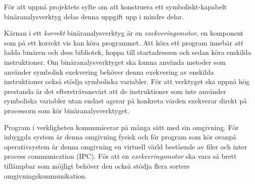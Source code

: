 

För att uppnå projektets syfte om att konstruera ett symboliskt-kapabelt
binäranalysverktyg delas denna uppgift upp i mindre delar.

Kärnan i ett \textit{korrekt} binäranalysverktyg är en
\textit{exekveringsmotor}, en komponent som på ett korrekt vis kan köra
programmet. Att köra ett program innebär att ladda binären och dess bibliotek,
hoppa till startadressen och sedan köra enskilda instruktioner. Om
binäranalysverktyget ska kunna använda metoder som använder symbolisk exekvering
behöver denna exekvering av enskilda instruktioner också stödja symboliska
variabler. För att verktyget ska uppnå hög prestanda är det eftersträvansvärt
att de instruktioner som inte använder symboliska variabler utan endast agerar
på konkreta värden exekverar direkt på processorn som kör binäranalysverktyget.

Program i verkligheten kommunicerar på många sätt med sin omgivning. För
inbyggda system är denna omgivning fysisk och för program som kör ovanpå
operativsystem är denna omgivning en virtuell värld bestående av filer och inter
process communication (IPC). För att en \textit{exekveringsmotor} ska vara så
brett tillämpbar som möjligt behöver den också stödja flera sorters
omgivningskommunikation.

